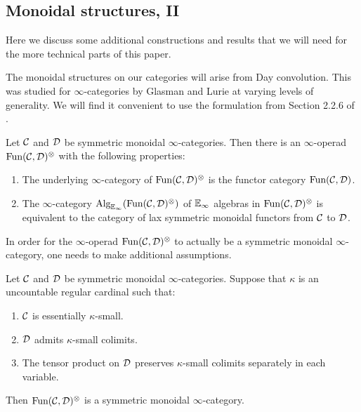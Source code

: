 
\subsection{Monoidal structures, II}\label{sect:monoidal2}
Here we discuss some additional constructions and results that we will need for the more technical parts of this paper.  %

The monoidal structures on our categories will arise from Day convolution.  This was studied for $\infty$-categories by Glasman \cite{Glasman} and Lurie \cite{LurieRot, HA} at varying levels of generality.  We will find it convenient to use the formulation from Section 2.2.6 of \cite{HA}.  

\begin{thm}
Let $\operatorname{\mathcal{C}}$ and $\operatorname{\mathcal{D}}$ be symmetric monoidal $\infty$-categories.  Then there is an $\infty$-operad $\operatorname{\text{Fun}}(\operatorname{\mathcal{C}}, \operatorname{\mathcal{D}})^{\otimes} $ with the following properties:
\begin{enumerate}
\item The underlying $\infty$-category of $\operatorname{\text{Fun}}(\operatorname{\mathcal{C}},\operatorname{\mathcal{D}})^{\otimes}$ is the functor category $\operatorname{\text{Fun}}(\operatorname{\mathcal{C}}, \operatorname{\mathcal{D}})$.
\item The $\infty$-category $\operatorname{\text{Alg}}_{\operatorname{\mathbb{E}}_\infty}(\operatorname{\text{Fun}}(\operatorname{\mathcal{C}}, \operatorname{\mathcal{D}})^{\otimes})$ of $\operatorname{\mathbb{E}}_\infty$ algebras in $\operatorname{\text{Fun}}(\operatorname{\mathcal{C}},\operatorname{\mathcal{D}})^{\otimes}$ is equivalent to the category of lax symmetric monoidal functors from $\operatorname{\mathcal{C}}$ to $\operatorname{\mathcal{D}}$.  

\end{enumerate}
\end{thm}

In order for the $\infty$-operad $\operatorname{\text{Fun}}(\operatorname{\mathcal{C}},\operatorname{\mathcal{D}})^{\otimes}$ to actually be a symmetric monoidal $\infty$-category, one needs to make additional assumptions.  

\begin{prop}\label{prop:dayconvsmc}
Let $\operatorname{\mathcal{C}}$ and $\operatorname{\mathcal{D}}$ be symmetric monoidal $\infty$-categories.  Suppose that $\kappa$ is an uncountable regular cardinal such that:
\begin{enumerate}
\item $\operatorname{\mathcal{C}}$ is essentially $\kappa$-small.
\item $\operatorname{\mathcal{D}}$ admits $\kappa$-small colimits.
\item The tensor product on $\operatorname{\mathcal{D}}$ preserves $\kappa$-small colimits separately in each variable.  
\end{enumerate}
Then $\operatorname{\text{Fun}}(\operatorname{\mathcal{C}},\operatorname{\mathcal{D}})^{\otimes}$ is a symmetric monoidal $\infty$-category.  
\end{prop}

